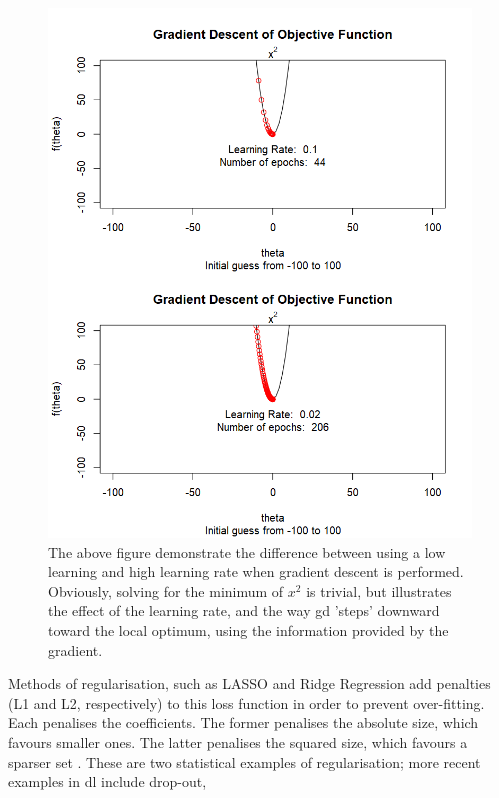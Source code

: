 \begin{figure}[h]
\centering
\includegraphics[width=\textwidth]{figs/gd_lr.png}
%
\caption[Illustration of gradient descent.]{The above figure demonstrate the difference between using a low learning and high learning rate when gradient descent is performed. Obviously, solving for the minimum of $x^2$ is trivial, but illustrates the effect of the learning rate, and the way \gls{gd} 'steps' downward toward the local optimum, using the information provided by the gradient.} 
\label{fig:good_sep_classes} %
\end{figure}


Methods of regularisation, such as LASSO and Ridge Regression add penalties (L1 and L2, respectively) to this loss function in order to prevent over-fitting. Each penalises the coefficients. The former penalises the absolute size, which favours smaller ones. The latter penalises the squared size, which favours a sparser set \cite{ridge_lasso}. These are two statistical examples of regularisation; more recent examples in \gls{dl} include drop-out,  %
\bigskip

